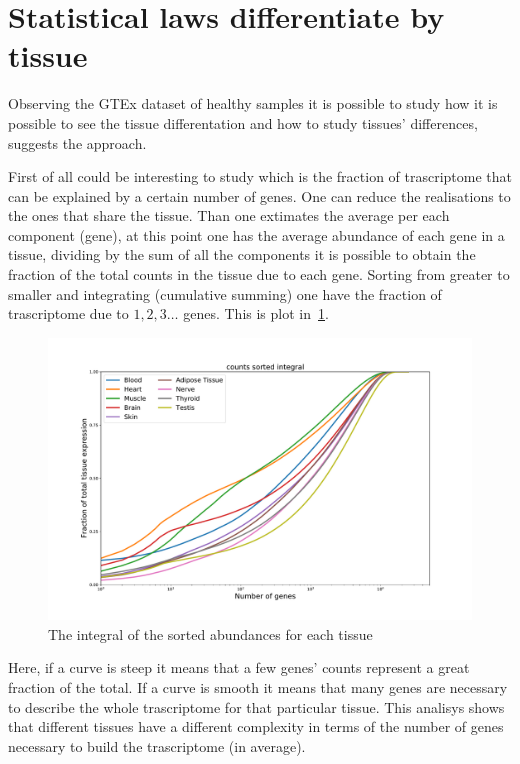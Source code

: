 \section{Statistical laws differentiate by tissue}
Observing the GTEx dataset of healthy samples it is possible to study how it is possible to see the tissue differentation and how to study tissues' differences,~\cite{mele2014} suggests the approach.

First of all could be interesting to study which is the fraction of trascriptome that can be explained by a certain number of genes.
One can reduce the realisations to the ones that share the tissue. Than one extimates the average per each component (gene), at this point one has the average abundance of each gene in a tissue, dividing by the sum of all the components it is possible to obtain the fraction of the total counts in the tissue due to each gene. Sorting from greater to smaller and integrating (cumulative summing) one have the fraction of trascriptome due to $1, 2, 3\dots$ genes. This is plot in~\ref{fig:structure/gtex/fraction_of_trascriptome}. 
\begin{figure}[htb!]
  \centering
  \includegraphics[width=0.9\linewidth]{pictures/structure/gtex/fraction_of_trascriptome.pdf}
  \caption{The integral of the sorted abundances for each tissue}
  \label{fig:structure/gtex/fraction_of_trascriptome}
\end{figure}
Here, if a curve is steep it means that a few genes' counts represent a great fraction of the total. If a curve is smooth it means that many genes are necessary to describe the whole trascriptome for that particular tissue.
This analisys shows that different tissues have a different complexity in terms of the number of genes necessary to build the trascriptome (in average).
